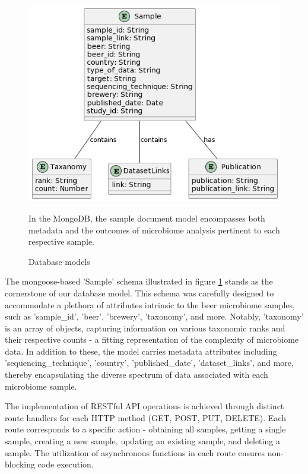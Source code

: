             \begin{figure}[H]
                \centering
                \includegraphics[scale=0.5]{images/db_model.png}
                \caption{Database models}
                \small In the MongoDB, the sample document model encompasses both metadata and the outcomes of microbiome analysis pertinent to each respective sample.
                \label{fig:methods:db_model}
            \end{figure}   
        
            The mongoose-based 'Sample' schema illustrated in figure \ref{fig:methods:db_model} stands as the cornerstone of our database model. This schema was carefully designed to accommodate a plethora of attributes intrinsic to the beer microbiome samples, such as 'sample\_id', 'beer', 'brewery', 'taxonomy', and more. Notably, 'taxonomy' is an array of objects, capturing information on various taxonomic ranks and their respective counts - a fitting representation of the complexity of microbiome data. In addition to these, the model carries metadata attributes including 'sequencing\_technique', 'country', 'published\_date', 'dataset\_links', and more, thereby encapsulating the diverse spectrum of data associated with each microbiome sample.
            
            The implementation of RESTful API operations is achieved through distinct route handlers for each HTTP method (GET, POST, PUT, DELETE). Each route corresponds to a specific action - obtaining all samples, getting a single sample, creating a new sample, updating an existing sample, and deleting a sample. The utilization of asynchronous functions in each route ensures non-blocking code execution.

